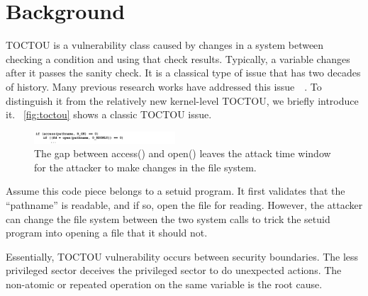 
\section{Background}
\label{sec:background}


TOCTOU is a vulnerability class caused by changes in a system between checking a condition and using that check results. Typically, a variable changes after it passes the sanity check. It is a classical type of issue that has two decades of history. Many previous research works have addressed this issue~\cite{dean2004fixing}~\cite{borisov2005fixing}. To distinguish it from the relatively new kernel-level TOCTOU, we briefly introduce it. ~\autoref{fig:toctou} shows a classic TOCTOU issue.
\begin{figure}[th]
	\includegraphics[width=0.47\textwidth]{figures/toctou}
	\centering
	\caption{The gap between access() and open() leaves the attack time window for the attacker to make changes in the file system.}
	\label{fig:toctou}
\end{figure}




Assume this code piece belongs to a setuid program. It first validates that the ``pathname'' is readable, and if so, open the file for reading. However, the attacker can change the file system between the two system calls to trick the setuid program into opening a file that it should not.

Essentially, TOCTOU vulnerability occurs between security boundaries. The less privileged sector deceives the privileged sector to do unexpected actions. The non-atomic or repeated operation on the same variable is the root cause.


